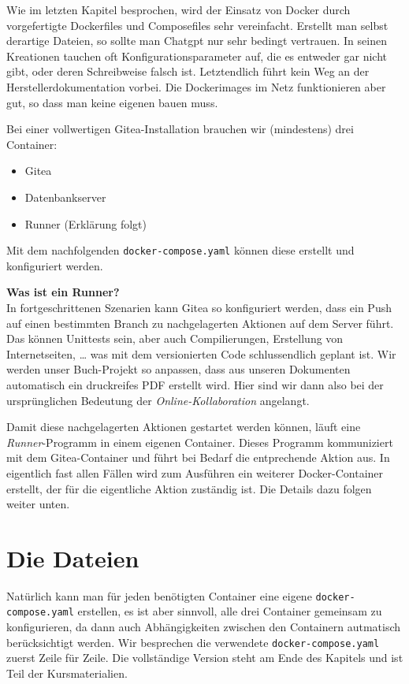 \documentclass[
  letterpaper,
  DIV=11]{scrreprt}
\providecommand{\tightlist}{%
  \setlength{\itemsep}{0pt}\setlength{\parskip}{0pt}}\usepackage{longtable,booktabs,array}
\begin{document}
Wie im letzten Kapitel besprochen, wird der Einsatz von Docker durch
vorgefertigte Dockerfiles und Composefiles sehr vereinfacht. Erstellt
man selbst derartige Dateien, so sollte man Chatgpt nur sehr bedingt
vertrauen. In seinen Kreationen tauchen oft Konfigurationsparameter auf,
die es entweder gar nicht gibt, oder deren Schreibweise falsch ist.
Letztendlich führt kein Weg an der Herstellerdokumentation vorbei. Die
Dockerimages im Netz funktionieren aber gut, so dass man keine eigenen
bauen muss.

Bei einer vollwertigen Gitea-Installation brauchen wir (mindestens) drei
Container:

\begin{itemize}
\tightlist
\item
  Gitea
\item
  Datenbankserver
\item
  Runner (Erklärung folgt)
\end{itemize}

Mit dem nachfolgenden \texttt{docker-compose.yaml} können diese erstellt
und konfiguriert werden.

\textbf{Was ist ein Runner?}\\
In fortgeschrittenen Szenarien kann Gitea so konfiguriert werden, dass
ein Push auf einen bestimmten Branch zu nachgelagerten Aktionen auf dem
Server führt. Das können Unittests sein, aber auch Compilierungen,
Erstellung von Internetseiten, \ldots{} was mit dem versionierten Code
schlussendlich geplant ist. Wir werden unser Buch-Projekt so anpassen,
dass aus unseren Dokumenten automatisch ein druckreifes PDF erstellt
wird. Hier sind wir dann also bei der ursprünglichen Bedeutung der
\emph{Online-Kollaboration} angelangt.

Damit diese nachgelagerten Aktionen gestartet werden können, läuft eine
\emph{Runner}-Programm in einem eigenen Container. Dieses Programm
kommuniziert mit dem Gitea-Container und führt bei Bedarf die
entprechende Aktion aus. In eigentlich fast allen Fällen wird zum
Ausführen ein weiterer Docker-Container erstellt, der für die
eigentliche Aktion zuständig ist. Die Details dazu folgen weiter unten.

\section{Die Dateien}\label{die-dateien}

Natürlich kann man für jeden benötigten Container eine eigene
\texttt{docker-compose.yaml} erstellen, es ist aber sinnvoll, alle drei
Container gemeinsam zu konfigurieren, da dann auch Abhängigkeiten
zwischen den Containern autmatisch berücksichtigt werden. Wir besprechen
die verwendete \texttt{docker-compose.yaml} zuerst Zeile für Zeile. Die
vollständige Version steht am Ende des Kapitels und ist Teil der
Kursmaterialien.
\end{document}
